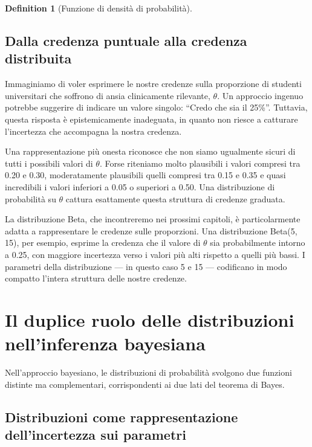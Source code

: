 \documentclass[
  letterpaper,
  DIV=11,
  numbers=noendperiod,
  oneside]{scrreprt}
\theoremstyle{definition}
\theoremstyle{plain}
\theoremstyle{definition}
\newtheorem{definition}{Definition}[chapter]
\theoremstyle{remark}
\begin{document}
\begin{definition}[Funzione di densità di
probabilità]
\subsection{Dalla credenza puntuale alla credenza
distribuita}\label{dalla-credenza-puntuale-alla-credenza-distribuita}

Immaginiamo di voler esprimere le nostre credenze sulla proporzione di
studenti universitari che soffrono di ansia clinicamente rilevante,
\(\theta\). Un approccio ingenuo potrebbe suggerire di indicare un
valore singolo: ``Credo che sia il 25\%''. Tuttavia, questa risposta è
epistemicamente inadeguata, in quanto non riesce a catturare
l'incertezza che accompagna la nostra credenza.

Una rappresentazione più onesta riconosce che non siamo ugualmente
sicuri di tutti i possibili valori di \(\theta\). Forse riteniamo molto
plausibili i valori compresi tra 0.20 e 0.30, moderatamente plausibili
quelli compresi tra 0.15 e 0.35 e quasi incredibili i valori inferiori a
0.05 o superiori a 0.50. Una distribuzione di probabilità su \(\theta\)
cattura esattamente questa struttura di credenze graduata.

La distribuzione Beta, che incontreremo nei prossimi capitoli, è
particolarmente adatta a rappresentare le credenze sulle proporzioni.
Una distribuzione Beta(5, 15), per esempio, esprime la credenza che il
valore di \(\theta\) sia probabilmente intorno a 0.25, con maggiore
incertezza verso i valori più alti rispetto a quelli più bassi. I
parametri della distribuzione --- in questo caso 5 e 15 --- codificano
in modo compatto l'intera struttura delle nostre credenze.

\section{Il duplice ruolo delle distribuzioni nell'inferenza
bayesiana}\label{il-duplice-ruolo-delle-distribuzioni-nellinferenza-bayesiana}

Nell'approccio bayesiano, le distribuzioni di probabilità svolgono due
funzioni distinte ma complementari, corrispondenti ai due lati del
teorema di Bayes.

\subsection{Distribuzioni come rappresentazione dell'incertezza sui
parametri}\label{distribuzioni-come-rappresentazione-dellincertezza-sui-parametri}


\end{definition}
\end{document}
